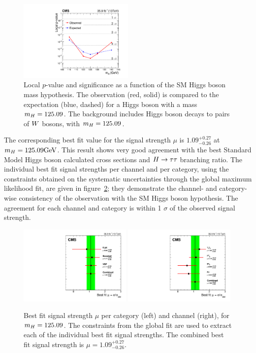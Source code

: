 \begin{figure}[!ht]
  \centering
    \includegraphics[width=0.5\textwidth]{higgs_to_taus/plots/Figure_020.pdf}
   \caption{Local ${p}$-value and significance as a function of the SM Higgs boson mass hypothesis. The 
observation (red, solid) is compared to the expectation (blue, dashed) for a Higgs boson with a mass 
$m_{H} = 125.09$\GeV. The background includes Higgs boson decays to pairs of $W$ bosons, with $m_{H} = 125.09$\GeV.}
\label{fig:htt_pvalue}
\end{figure}


The corresponding best fit value for the signal strength $\mu$ is $1.09 ^{+0.27} _{-0.26}$ at $m_{H} = 125.09\mathrm{GeV}$. 
This result shows very good agreement with the best Standard Model Higgs boson calculated cross sections
and $H\to\tau\tau$ branching ratio.
The individual best fit signal strengths per channel and per category, using the constraints obtained on the 
systematic uncertainties through the global maximum likelihood fit, are given in figure~\ref{fig:htt_muvalue}; they demonstrate 
the channel- and category-wise consistency of the observation with the SM Higgs boson hypothesis. The agreement
for each channel and category is within 1 $\sigma$ of the observed signal strength.

\begin{figure}[!ht]
  \centering
    \includegraphics[width=0.49\textwidth]{higgs_to_taus/plots/Figure_021-a.pdf}
    \includegraphics[width=0.49\textwidth]{higgs_to_taus/plots/Figure_021-b.pdf}
   \caption{Best fit signal strength $\mu$ per category (left) and channel (right), for $m_{H} = 125.09$\GeV. 
The constraints from the global fit are used to extract each of the individual best fit signal strengths. 
The combined best fit signal strength is $\mu = 1.09 ^{+0.27} _{-0.26}$.}
\label{fig:htt_muvalue}
\end{figure}


